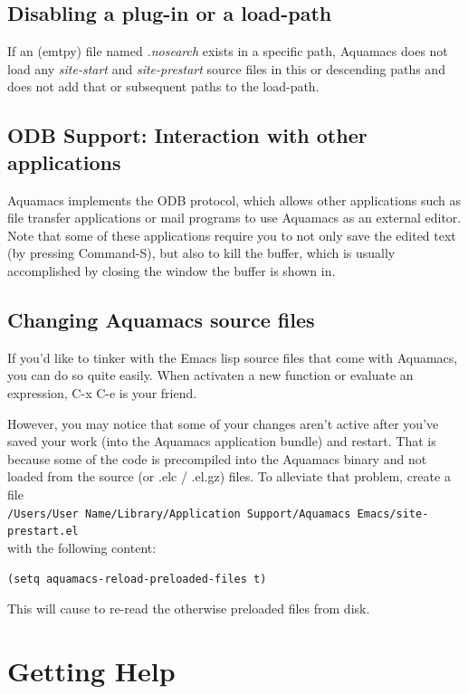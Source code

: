 \documentclass[11pt,letterpaper]{article}
\newcommand{\ttfile}{\tt}
\begin{document}
\subsection{Disabling a plug-in or a load-path}

If an (emtpy) file named \emph{.nosearch} exists in a specific path, Aquamacs does not load any \emph
{site-start} and \emph{site-prestart} source files in this or descending paths and does not add that or 
subsequent paths to the load-path. 

\subsection{ODB Support: Interaction with other applications}

Aquamacs implements the ODB protocol, which allows other applications such as file transfer applications or mail programs to use Aquamacs as an external editor.  Note that some of these applications require you to not only save the edited text (by pressing Command-S), but also to kill the buffer, which is usually accomplished by closing the window the buffer is shown in.

\subsection{Changing Aquamacs source files}

If you'd like to tinker with the Emacs lisp source files that come with Aquamacs, you can do so quite easily. When activaten a new function or evaluate an expression, C-x C-e is your friend.

However, you may notice that some of your changes aren't active after you've saved your work (into the Aquamacs application bundle) and restart. That is because some of the code is precompiled into the Aquamacs binary and not loaded from the source (or .elc / .el.gz) files. To alleviate that problem, create a
file\\
{\ttfile /Users/User Name/Library/Application Support/Aquamacs Emacs/site-prestart.el} \\ with the following content:

\texttt{(setq aquamacs-reload-preloaded-files t)}

This will cause to re-read the otherwise preloaded files from disk.

\section{Getting Help}
\end{document}
